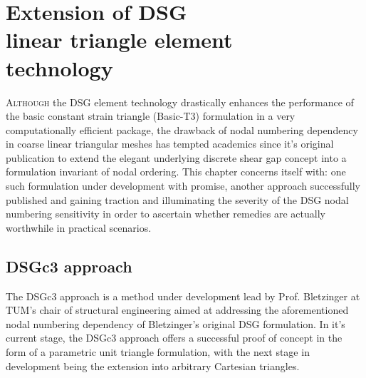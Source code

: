 



\chapter[Extension of DSG triangle element technology  - REVIEWED 0 !!!!!]{Extension of DSG \\ linear triangle element \\ technology}
\label{chap:chapter_dsg_extension}

\renewcommand{\Thema}{Extension of DSG linear triangle element technology}

\lettrine[lines=2]{A}{lthough} the DSG element technology drastically enhances the performance of the basic constant strain triangle (Basic-T3) formulation in a very computationally efficient package, the drawback of nodal numbering dependency in coarse linear triangular meshes has tempted academics since it's original publication to extend the elegant underlying discrete shear gap concept into a formulation invariant of nodal ordering. This chapter concerns itself with: one such formulation under development with promise, another approach successfully published and gaining traction and illuminating the severity of the DSG nodal numbering sensitivity in order to ascertain whether remedies are actually worthwhile in practical scenarios.

\section{DSGc3 approach}
The DSGc3 approach is a method under development lead by Prof. Bletzinger at TUM's chair of structural engineering aimed at addressing the aforementioned nodal numbering dependency of Bletzinger's original DSG formulation. In it's current stage, the DSGc3 approach offers a successful proof of concept in the form of a parametric unit triangle formulation, with the next stage in development being the extension into arbitrary Cartesian triangles. 

